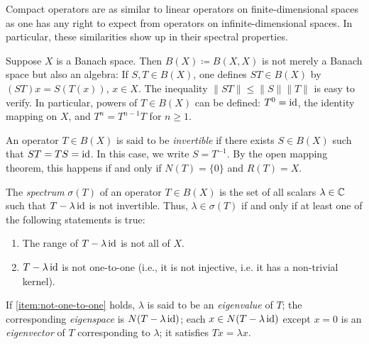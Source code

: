 Compact operators are as similar to linear operators on finite-dimensional spaces as one has any right to expect from operators on infinite-dimensional spaces. 
In particular, these similarities show up in their spectral properties.

\begin{definition}
Suppose $X$ is a Banach space.
Then $B(X) \coloneq B(X,X)$ is not merely a Banach space but also an algebra:
If $S,T \in B(X)$, one defines $ST \in B(X)$ by
\(
(ST)x = S(T(x))
\), $x \in X$.
The inequality $\|ST\| \leq \|S\| \|T\|$ is easy to verify.
In particular, powers of $T \in B(X)$ can be defined:
$T^0 = \operatorname{id}$, the identity mapping on $X$, and $T^n = T^{n-1}T$ for $n \geq 1$.
\end{definition}

\begin{definition}
An operator $T \in B(X)$ is said to be \emph{invertible} if there exists $S \in B(X)$ such that $ST = TS = \operatorname{id}$.
In this case, we write $S = T^{-1}$.
By the open mapping theorem, this happens if and only if $N(T) = \{0\}$ and $R(T) = X$.
\end{definition}


\begin{definition}\label{def:spectrum}
The \emph{spectrum} $\sigma(T)$ of an operator $T \in B(X)$ is the set of all scalars $\lambda \in \mathbb{C}$ such that $T - \lambda \operatorname{id}$ is not invertible.
Thus, $\lambda \in \sigma(T)$ if and only if at least one of the following statements is true:
\begin{enumerate}[label=(\roman*)]
\item The range of $T - \lambda \operatorname{id}$ is not all of $X$.
\item $T - \lambda \operatorname{id}$ is not one-to-one (i.e., it is not injective, i.e. it has a non-trivial kernel). \label{item:not-one-to-one}
\end{enumerate}
If \ref{item:not-one-to-one} holds, $\lambda$ is said to be an \emph{eigenvalue} of $T$;
the corresponding \emph{eigenspace} is $N(T - \lambda \operatorname{id})$;
each $x \in N(T - \lambda \operatorname{id})$ except $x = 0$ is an \emph{eigenvector} of $T$ corresponding to $\lambda$;
it satisfies $Tx = \lambda x$.
\end{definition}

